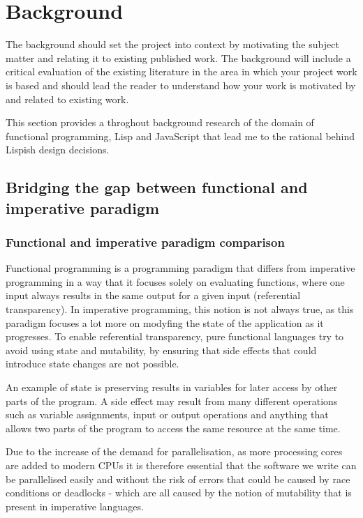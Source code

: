 \chapter{Background}
The background should set the project into context by motivating the subject matter and relating it to existing published work. The background will include a critical evaluation of the existing literature in the area in which your project work is based and should lead the reader to understand how your work is motivated by and related to existing work.

This section provides a throghout background research of the domain of functional programming, Lisp and JavaScript that lead me to the rational behind Lispish design decisions.

\section{Bridging the gap between functional and imperative paradigm}

\subsection{Functional and imperative paradigm comparison}
Functional programming is a programming paradigm that differs from imperative programming in a way that it focuses solely on evaluating functions, where one input always results in the same output for a given input (referential transparency). In imperative programming, this notion is not always true, as this paradigm focuses a lot more on modyfing the state of the application as it progresses. To enable referential transparency, pure functional languages try to avoid using state and mutability, by ensuring that side effects that could introduce state changes are not possible.

An example of state is preserving results in variables for later access by other parts of the program. A side effect may result from many different operations such as variable assignments, input or output operations and anything that allows two parts of the program to access the same resource at the same time.

Due to the increase of the demand for parallelisation, as more processing cores are added to modern CPUs it is therefore essential that the software we write can be parallelised easily and without the risk of errors that could be caused by race conditions or deadlocks - which are all caused by the notion of mutability that is present in imperative languages. 

